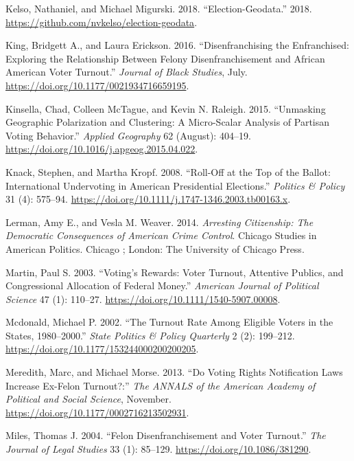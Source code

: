 \documentclass[
  12pt,
]{article}
\newlength{\cslhangindent}
\newenvironment{cslreferences}%
  {\setlength{\parindent}{0pt}%
  \everypar{\setlength{\hangindent}{\cslhangindent}}\ignorespaces}%
  {\par}
\begin{document}
\begin{cslreferences}
\leavevmode\hypertarget{ref-Kelso2018}{}%
Kelso, Nathaniel, and Michael Migurski. 2018. ``Election-Geodata.'' 2018. \url{https://github.com/nvkelso/election-geodata}.

\leavevmode\hypertarget{ref-King2016}{}%
King, Bridgett A., and Laura Erickson. 2016. ``Disenfranchising the Enfranchised: Exploring the Relationship Between Felony Disenfranchisement and African American Voter Turnout.'' \emph{Journal of Black Studies}, July. \url{https://doi.org/10.1177/0021934716659195}.

\leavevmode\hypertarget{ref-Kinsella2015}{}%
Kinsella, Chad, Colleen McTague, and Kevin N. Raleigh. 2015. ``Unmasking Geographic Polarization and Clustering: A Micro-Scalar Analysis of Partisan Voting Behavior.'' \emph{Applied Geography} 62 (August): 404--19. \url{https://doi.org/10.1016/j.apgeog.2015.04.022}.

\leavevmode\hypertarget{ref-Knack2008}{}%
Knack, Stephen, and Martha Kropf. 2008. ``Roll-Off at the Top of the Ballot: International Undervoting in American Presidential Elections.'' \emph{Politics \& Policy} 31 (4): 575--94. \url{https://doi.org/10.1111/j.1747-1346.2003.tb00163.x}.

\leavevmode\hypertarget{ref-Lerman2014}{}%
Lerman, Amy E., and Vesla M. Weaver. 2014. \emph{Arresting Citizenship: The Democratic Consequences of American Crime Control}. Chicago Studies in American Politics. Chicago ; London: The University of Chicago Press.

\leavevmode\hypertarget{ref-Martin2003}{}%
Martin, Paul S. 2003. ``Voting's Rewards: Voter Turnout, Attentive Publics, and Congressional Allocation of Federal Money.'' \emph{American Journal of Political Science} 47 (1): 110--27. \url{https://doi.org/10.1111/1540-5907.00008}.

\leavevmode\hypertarget{ref-Mcdonald2002}{}%
Mcdonald, Michael P. 2002. ``The Turnout Rate Among Eligible Voters in the States, 1980--2000.'' \emph{State Politics \& Policy Quarterly} 2 (2): 199--212. \url{https://doi.org/10.1177/153244000200200205}.

\leavevmode\hypertarget{ref-Meredith2013}{}%
Meredith, Marc, and Michael Morse. 2013. ``Do Voting Rights Notification Laws Increase Ex-Felon Turnout?:'' \emph{The ANNALS of the American Academy of Political and Social Science}, November. \url{https://doi.org/10.1177/0002716213502931}.

\leavevmode\hypertarget{ref-Miles2004}{}%
Miles, Thomas J. 2004. ``Felon Disenfranchisement and Voter Turnout.'' \emph{The Journal of Legal Studies} 33 (1): 85--129. \url{https://doi.org/10.1086/381290}.


\end{cslreferences}
\end{document}
